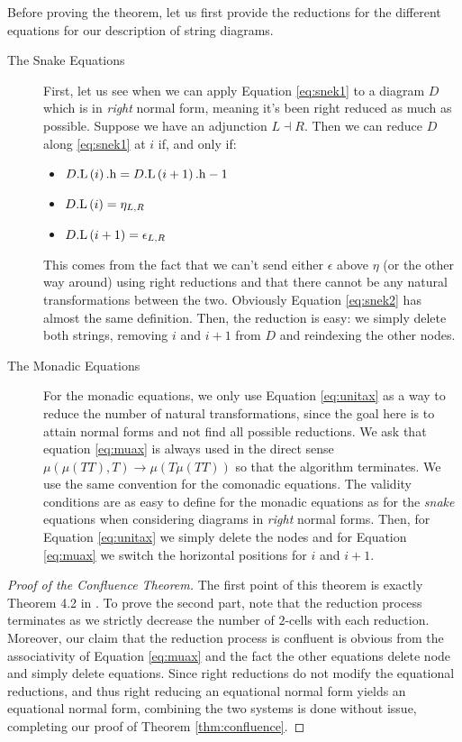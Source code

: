 Before proving the theorem, let us first provide the reductions for the different
equations for our description of string diagrams.
\begin{description}
	\item[The Snake Equations]
	      First, let us see when we can apply Equation \ref{eq:snek1} to a diagram $D$ which is in \emph{right} normal form, meaning it's been right reduced as much as possible.
	      Suppose we have an adjunction $L \dashv R$.
	      Then we can reduce $D$ along \eqref{eq:snek1} at $i$ if, and only if:
	      \begin{itemize}
		      \item $D\mathrm{.L}\left(i\right)\mathrm{.h} = D\mathrm{.L}\left(i + 1\right)\mathrm{.h} - 1$
		      \item $D\mathrm{.L}\left(i\right) = \eta_{L, R}$
		      \item $D\mathrm{.L}\left(i + 1\right) = \epsilon_{L, R}$
	      \end{itemize}
	      This comes from the fact that we can't send either $\epsilon$
	      above $\eta$ (or the other way around) using right reductions and
	      that there cannot be any natural transformations between the two.
	      Obviously Equation \ref{eq:snek2} has almost the same definition.
	      Then, the reduction is easy: we simply delete both strings,
	      removing $i$ and $i + 1$ from $D$ and reindexing the other nodes.
	\item[The Monadic Equations] For the monadic equations, we only use
	      Equation \ref{eq:unitax} as a way to reduce the number of natural
	      transformations, since the goal here is to attain normal forms
	      and not find all possible reductions.
	      We ask that equation \ref{eq:muax} is always used in the direct
	      sense $\mu\left( \mu\left( TT \right),T \right) \to \mu\left(
		      T\mu\left( TT \right) \right)$ so that the algorithm terminates.
	      We use the same convention for the comonadic equations.
	      The validity conditions are as easy to define for the monadic
	      equations as for the \emph{snake} equations when considering
	      diagrams in \emph{right} normal forms.
	      Then, for Equation \eqref{eq:unitax} we simply delete the nodes
	      and for Equation \eqref{eq:muax} we switch the horizontal
	      positions for $i$ and $i + 1$.
\end{description}

\begin{proof}[Proof of the Confluence Theorem]
	The first point of this theorem is exactly Theorem 4.2
	in \cite{delpeuchNormalizationPlanarString2022}.
	To prove the second part, note that the reduction process terminates as
	we strictly decrease the number of $2$-cells with each reduction.
	Moreover, our claim that the reduction process is confluent is obvious
	from the associativity of Equation \eqref{eq:muax} and the fact the other
	equations delete node and simply delete equations.
	Since right reductions do not modify the equational reductions, and thus
	right reducing an equational normal form yields an equational normal form,
	combining the two systems is done without issue, completing our proof of
	Theorem \ref{thm:confluence}.
\end{proof}



